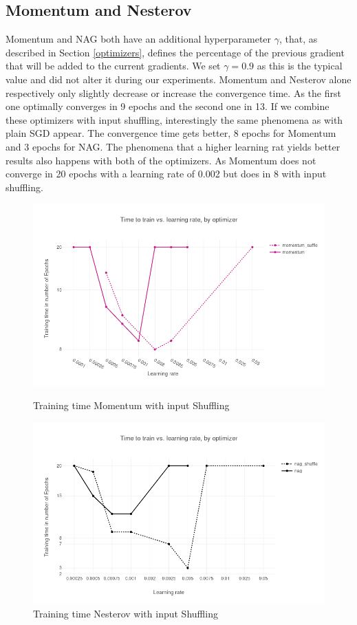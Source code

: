 \subsection{Momentum and Nesterov}
Momentum and NAG \cite{nag} both have an additional hyperparameter $\gamma$, that, as described in Section \ref{optimizers}, defines the percentage of the previous gradient that will be added to the current gradients. We set $\gamma = 0.9$ as this is the typical value and did not alter it during our experiments. Momentum and Nesterov alone respectively only slightly decrease or increase the convergence time. As the first one optimally converges in 9 epochs and the second one in 13. If we combine these optimizers with input shuffling, interestingly the same phenomena as with plain SGD appear. The convergence time gets better, 8 epochs for Momentum and 3 epochs for NAG. The phenomena that a higher learning rat yields better results also happens with both of the optimizers. As Momentum does not converge in 20 epochs with a learning rate of 0.002 but does in 8 with input shuffling. 
\begin{figure}[h]
\centering
\begin{minipage}{.5\textwidth}
  \centering
      \includegraphics[scale=0.3]{images/results_mom_shuffle} 
    \caption{Training time  Momentum with input Shuffling}
    \label{fig:results_mom}
  \label{fig:test1}
\end{minipage}%
\begin{minipage}{.5\textwidth}
  \centering
    \includegraphics[scale=0.3]{images/results_nag_shuffle} 
    \caption{Training time  Nesterov with input Shuffling}
    \label{fig:results_nag}
\end{minipage}
\end{figure}
